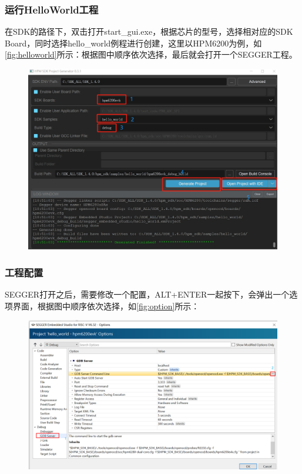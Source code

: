 \subsubsection{运行HelloWorld工程}
在SDK的路径下，双击打开start\_gui.exe，根据芯片的型号，选择相对应的SDK Board，同时选择hello\_world例程进行创建，这里以HPM6200为例，如\autoref{fig:helloworld}所示：根据图中顺序依次选择，最后就会打开一个SEGGER工程。\par
\vspace{\baselineskip}
\vspace{0.3cm}
\begin{figure}[H]
	\centering
	\includegraphics[width=0.7\linewidth]{img/helloworld}
	\caption{}
	\label{fig:helloworld}
\end{figure}

\vspace{\baselineskip}
\vspace{0.5cm} 

\subsubsection{工程配置}
SEGGER打开之后，需要修改一个配置，ALT+ENTER一起按下，会弹出一个选项界面，根据图中顺序依次选择，如\autoref{fig:option}所示：\par
\vspace{\baselineskip}
\vspace{0.2cm}
\begin{figure}[H]
	\centering
	\includegraphics[width=0.7\linewidth]{img/option}
	\caption{}
	\label{fig:option}
\end{figure}


